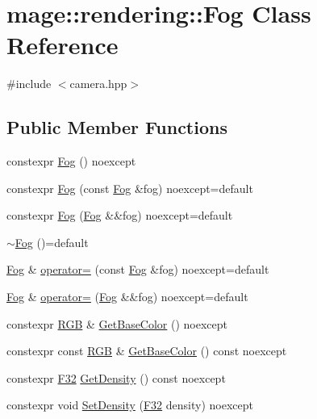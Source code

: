 \hypertarget{classmage_1_1rendering_1_1_fog}{}\section{mage\+:\+:rendering\+:\+:Fog Class Reference}
\label{classmage_1_1rendering_1_1_fog}


{\ttfamily \#include $<$camera.\+hpp$>$}

\subsection*{Public Member Functions}
\begin{DoxyCompactItemize}
\item 
constexpr \mbox{\hyperlink{classmage_1_1rendering_1_1_fog_a48489b0ce940aff4395eb5ea88394081}{Fog}} () noexcept
\item 
constexpr \mbox{\hyperlink{classmage_1_1rendering_1_1_fog_a2f730d70ed426468f113d44e7810394b}{Fog}} (const \mbox{\hyperlink{classmage_1_1rendering_1_1_fog}{Fog}} \&fog) noexcept=default
\item 
constexpr \mbox{\hyperlink{classmage_1_1rendering_1_1_fog_aeed9b3fc18dabe37199c51ed7c4f5930}{Fog}} (\mbox{\hyperlink{classmage_1_1rendering_1_1_fog}{Fog}} \&\&fog) noexcept=default
\item 
\mbox{\hyperlink{classmage_1_1rendering_1_1_fog_a3dfb641a2c5688172e3c4be7c91631a2}{$\sim$\+Fog}} ()=default
\item 
\mbox{\hyperlink{classmage_1_1rendering_1_1_fog}{Fog}} \& \mbox{\hyperlink{classmage_1_1rendering_1_1_fog_a79bb3e3b7cbae494ae6f4d7f84a61aae}{operator=}} (const \mbox{\hyperlink{classmage_1_1rendering_1_1_fog}{Fog}} \&fog) noexcept=default
\item 
\mbox{\hyperlink{classmage_1_1rendering_1_1_fog}{Fog}} \& \mbox{\hyperlink{classmage_1_1rendering_1_1_fog_a60a4ed93bba16c6acfec807c0e753b22}{operator=}} (\mbox{\hyperlink{classmage_1_1rendering_1_1_fog}{Fog}} \&\&fog) noexcept=default
\item 
constexpr \mbox{\hyperlink{structmage_1_1_r_g_b}{R\+GB}} \& \mbox{\hyperlink{classmage_1_1rendering_1_1_fog_af2ba57f86df0f681ad6b67cba5fc8dc1}{Get\+Base\+Color}} () noexcept
\item 
constexpr const \mbox{\hyperlink{structmage_1_1_r_g_b}{R\+GB}} \& \mbox{\hyperlink{classmage_1_1rendering_1_1_fog_a2a1441d2a0cdbc074260fa1af7fc656a}{Get\+Base\+Color}} () const noexcept
\item 
constexpr \mbox{\hyperlink{namespacemage_aa97e833b45f06d60a0a9c4fc22ae02c0}{F32}} \mbox{\hyperlink{classmage_1_1rendering_1_1_fog_ac99a5479a39027723807296c49fdfbc8}{Get\+Density}} () const noexcept
\item 
constexpr void \mbox{\hyperlink{classmage_1_1rendering_1_1_fog_a9b498c71c58e28bd58b09e4385338a13}{Set\+Density}} (\mbox{\hyperlink{namespacemage_aa97e833b45f06d60a0a9c4fc22ae02c0}{F32}} density) noexcept
\end{DoxyCompactItemize}
